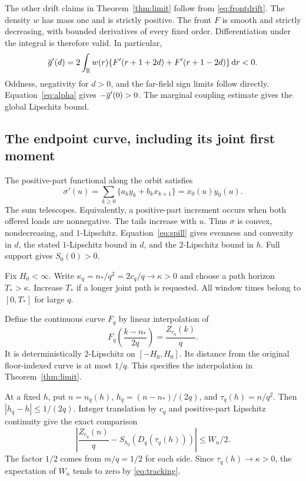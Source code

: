 The other drift claims in Theorem~\ref{thm:limit} follow from \eqref{eq:frontdrift}. The density $w$ has mass one and is strictly positive. The front $F$ is smooth and strictly decreasing, with bounded derivatives of every fixed order. Differentiation under the integral is therefore valid. In particular,
\[
 \overline g'(d)=2\int_\mathbb R w(r)\{F'(r+1+2d)+F'(r+1-2d)\}\,\mathrm d r<0.
\]
Oddness, negativity for $d>0$, and the far-field sign limits follow directly. Equation~\eqref{eq:alpha} gives $-\overline g'(0)>0$. The marginal coupling estimate gives the global Lipschitz bound.

\subsection{The endpoint curve, including its joint first moment}
The positive-part functional along the orbit satisfies
\begin{equation}\label{eq:sigmaprime}
 \sigma'(u)=\sum_{k\ge0}\{a_ky_k+b_kx_{k+1}\}=x_0(u)y_0(u).
\end{equation}
The sum telescopes. Equivalently, a positive-part increment occurs when both offered loads are nonnegative. The tails increase with $u$. Thus $\sigma$ is convex, nondecreasing, and $1$-Lipschitz. Equation~\eqref{eq:spill} gives evenness and convexity in $d$, the stated $1$-Lipschitz bound in $d$, and the $2$-Lipschitz bound in $h$. Full support gives $S_0(0)>0$.

Fix $H_0<\infty$. Write $\kappa_q=n_*/q^2=2c_q/q\to\kappa>0$ and choose a path horizon $T_*>\kappa$. Increase $T_*$ if a longer joint path is requested. All window times belong to $[0,T_*]$ for large $q$.

Define the continuous curve $F_q$ by linear interpolation of
\[
 F_q\left(\frac{k-n_*}{2q}\right)=\frac{Z_{c_q}(k)}q.
\]
It is deterministically $2$-Lipschitz on $[-H_0,H_0]$. Its distance from the original floor-indexed curve is at most $1/q$. This specifies the interpolation in Theorem~\ref{thm:limit}.

At a fixed $h$, put $n=n_q(h)$, $h_q=(n-n_*)/(2q)$, and $\tau_q(h)=n/q^2$. Then $|h_q-h|\le1/(2q)$. Integer translation by $c_q$ and positive-part Lipschitz continuity give the exact comparison
\begin{equation}\label{eq:endpointcomparison}
 \left|\frac{Z_{c_q}(n)}q-S_{h_q}(D_q(\tau_q(h)))\right|
 \le W_n/2.
\end{equation}
The factor $1/2$ comes from $m/q=1/2$ for each side. Since $\tau_q(h)\to\kappa>0$, the expectation of $W_n$ tends to zero by \eqref{eq:tracking}.

